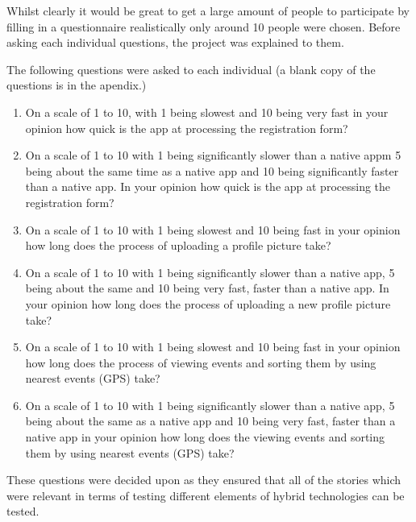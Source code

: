 Whilst clearly it would be great to get a large amount of people to participate by filling in a questionnaire realistically only around 10 people were chosen. Before asking each individual questions, the project was explained to them.

The following questions were asked to each individual (a blank copy of the questions is in the apendix.)

\begin{enumerate}
\item On a scale of 1 to 10, with 1 being slowest and 10 being very fast in your opinion how quick is the app at processing the registration form?
\item On a scale of 1 to 10 with 1 being significantly slower than a native appm 5 being about the same time as a native app and 10 being significantly faster than a native app. In your opinion how quick is the app at processing the registration form?
\item On a scale of 1 to 10 with 1 being slowest and 10 being fast in your opinion how long does the process of uploading a profile picture take?
\item On a scale of 1 to 10 with 1 being significantly slower than a native app, 5 being about the same and 10 being very fast, faster than a native app. In your opinion how long does the process of uploading a new profile picture take?
\item On a scale of 1 to 10 with 1 being slowest and 10 being fast in your opinion how long does the process of viewing events and sorting them by using nearest events (GPS) take?
\item On a scale of 1 to 10 with 1 being significantly slower than a native app, 5 being about the same as a native app and 10 being very fast, faster than a native app in your opinion how long does the viewing events and sorting them by using nearest events (GPS) take?
\end{enumerate}
These questions were decided upon as they ensured that all of the stories which were relevant in terms of testing different elements of hybrid technologies can be tested.

